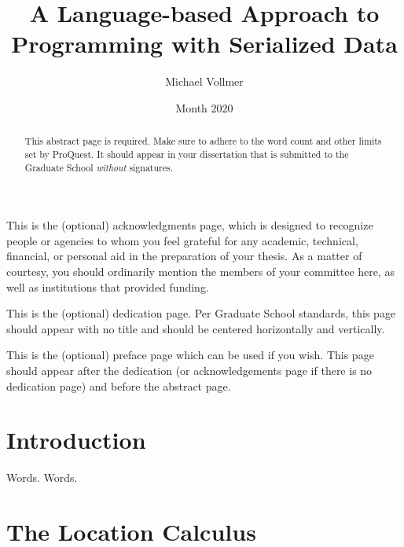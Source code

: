 \documentclass[showabstract,showacknowledgments,showpreface,showdedication]{iuphd}
\title{A Language-based Approach to Programming with Serialized Data}
\author{Michael Vollmer}
\date{Month 2020} %
\begin{document}
\maketitle
\acceptancepage




\begin{acknowledgments}
This is the (optional) acknowledgments page, which is designed to recognize people or agencies to whom you feel grateful for any academic, technical, financial, or personal aid in the preparation of your thesis. As a matter of courtesy, you should ordinarily mention the members of your committee here, as well as institutions that provided funding.
\end{acknowledgments}


\begin{dedication}
This is the (optional) dedication page. Per Graduate School standards, this page should appear with no title and should be centered horizontally and vertically.
\end{dedication}


\begin{preface}
This is the (optional) preface page which can be used if you wish. This page should appear after the dedication (or acknowledgements page if there is no dedication page) and before the abstract page.
\end{preface}


\begin{abstract}
This abstract page is required. Make sure to adhere to the word count and other limits set by ProQuest. It should appear in your dissertation that is submitted to the Graduate School \emph{without} signatures.
\end{abstract}

\newpage


\tableofcontents

\chapter{Introduction}

Words. Words.

\chapter{The Location Calculus}
\end{document}
